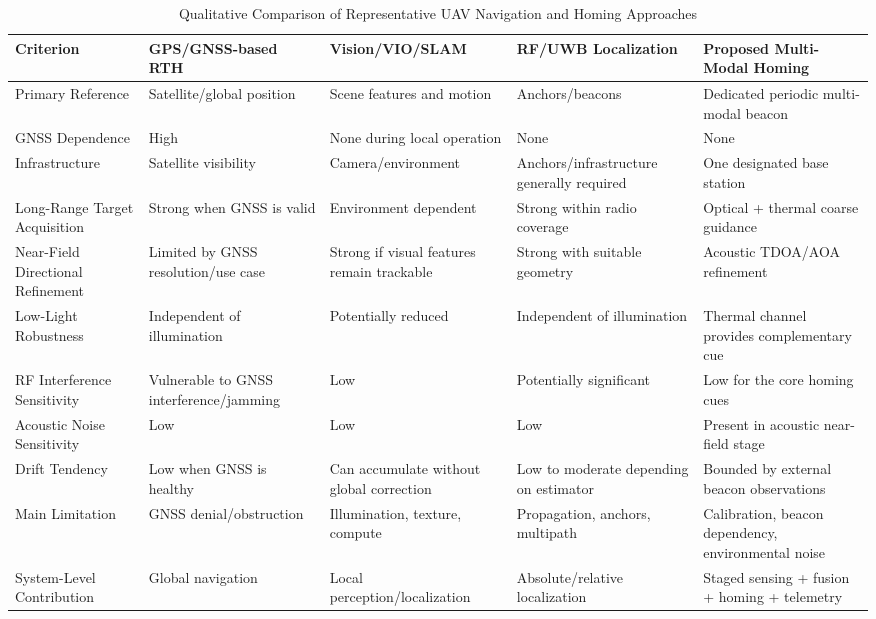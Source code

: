 \documentclass[conference]{IEEEtran}
\begin{document}
\begin{table}[t]
\centering
\caption{Qualitative Comparison of Representative UAV Navigation and Homing Approaches}
\label{tab:comparison}
\small
\begin{tabular}{p{2.8cm}p{3.3cm}p{3.3cm}p{3.3cm}p{3.5cm}}
\toprule
\textbf{Criterion} &
\textbf{GPS/GNSS-based RTH} &
\textbf{Vision/VIO/SLAM} &
\textbf{RF/UWB Localization} &
\textbf{Proposed Multi-Modal Homing} \\
\midrule
Primary Reference &
Satellite/global position &
Scene features and motion &
Anchors/beacons &
Dedicated periodic multi-modal beacon \\

GNSS Dependence &
High &
None during local operation &
None &
None \\

Infrastructure &
Satellite visibility &
Camera/environment &
Anchors/infrastructure generally required &
One designated base station \\

Long-Range Target Acquisition &
Strong when GNSS is valid &
Environment dependent &
Strong within radio coverage &
Optical + thermal coarse guidance \\

Near-Field Directional Refinement &
Limited by GNSS resolution/use case &
Strong if visual features remain trackable &
Strong with suitable geometry &
Acoustic TDOA/AOA refinement \\

Low-Light Robustness &
Independent of illumination &
Potentially reduced &
Independent of illumination &
Thermal channel provides complementary cue \\

RF Interference Sensitivity &
Vulnerable to GNSS interference/jamming &
Low &
Potentially significant &
Low for the core homing cues \\

Acoustic Noise Sensitivity &
Low &
Low &
Low &
Present in acoustic near-field stage \\

Drift Tendency &
Low when GNSS is healthy &
Can accumulate without global correction &
Low to moderate depending on estimator &
Bounded by external beacon observations \\

Main Limitation &
GNSS denial/obstruction &
Illumination, texture, compute &
Propagation, anchors, multipath &
Calibration, beacon dependency, environmental noise \\

System-Level Contribution &
Global navigation &
Local perception/localization &
Absolute/relative localization &
Staged sensing + fusion + homing + telemetry \\

\bottomrule
\end{tabular}
\end{table}
\end{document}
